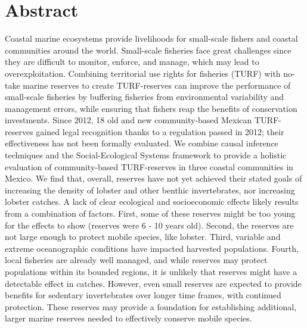 \documentclass[10pt,letterpaper]{article}
\begin{document}
\section*{Abstract}
Coastal marine ecosystems provide livelihoods for small-scale fishers and coastal communities around the world. Small-scale fisheries face great challenges since they are difficult to monitor, enforce, and manage, which may lead to overexploitation. Combining territorial use rights for fisheries (TURF) with no-take marine reserves to create TURF-reserves can improve the performance of small-scale fisheries by buffering fisheries from environmental variability and management errors, while ensuring that fishers reap the benefits of conservation investments. Since 2012, 18 old and new community-based Mexican TURF-reserves gained legal recognition thanks to a regulation passed in 2012; their effectiveness has not been formally evaluated. We combine causal inference techniques and the Social-Ecological Systems framework to provide a holistic evaluation of community-based TURF-reserves in three coastal communities in Mexico. We find that, overall, reserves have not yet achieved their stated goals of increasing the density of lobster and other benthic invertebrates, nor increasing lobster catches. A lack of clear ecological and socioeconomic effects likely results from a combination of factors. First, some of these reserves might be too young for the effects to show (reserves were 6 - 10  years old). Second, the reserves are not large enough to protect mobile species, like lobster. Third, variable and extreme oceanographic conditions have impacted harvested populations. Fourth, local fisheries are already well managed, and while reserves may protect populations within its bounded regions, it is unlikely that reserves might have a detectable effect in catches. However, even small reserves are expected to provide benefits for sedentary invertebrates over longer time frames, with continued protection. These reserves may provide a foundation for establishing additional, larger marine reserves needed to effectively conserve mobile species.

\end{document}
